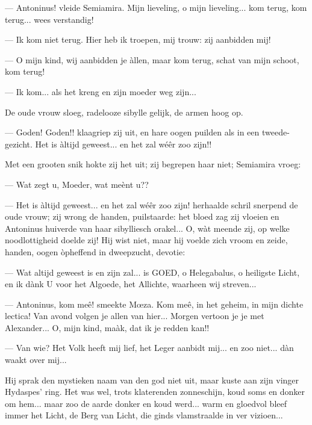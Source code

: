 \documentclass[a4paper, 12pt, oneside, dutch]{article}
\begin{document}
--- Antoninus! vleide Semiamira. Mijn lieveling, o mijn lieveling... kom terug, kom terug... wees verstandig!

--- Ik kom niet terug. Hier heb ik troepen, mij trouw: zij aanbidden mij!

--- O mijn kind, wij aanbidden je àllen, maar kom terug, schat van mijn schoot, kom terug!

--- Ik kom... als het kreng en zijn moeder weg zijn...

De oude vrouw sloeg, radelooze sibylle gelijk, de armen hoog op.

--- Goden! Goden!! klaagriep zij uit, en hare oogen puilden als in een tweede-gezicht. Het is àltijd geweest... en het zal wéêr zoo zijn!!

Met een grooten snik hokte zij het uit; zij begrepen haar niet; Semiamira vroeg:

--- Wat zegt u, Moeder, wat meènt u??

--- Het is àltijd geweest... en het zal wéêr zoo zijn! herhaalde schril snerpend de oude vrouw; zij wrong de handen, puilstaarde: het bloed zag zij vloeien en Antoninus huiverde van haar sibylliesch orakel... O, wàt meende zij, op welke noodlottigheid doelde zij! Hij wist niet, maar hij voelde zich vroom en zeide, handen, oogen òpheffend in dweepzucht, devotie:

--- Wat altijd geweest is en zijn zal... is GOED, o Helegabalus, o heiligste Licht, en ik dànk U voor het Algoede, het Allichte, waarheen wij streven...

--- Antoninus, kom meê! smeekte Mœza. Kom meê, in het geheim, in mijn dichte lectica! Van avond volgen je allen van hier... Morgen vertoon je je met Alexander... O, mijn kind, maàk, dat ik je redden kan!!

--- Van wie? Het Volk heeft mij lief, het Leger aanbidt mij... en zoo niet... dàn waakt over mij...

Hij sprak den mystieken naam van den god niet uit, maar kuste aan zijn vinger Hydaspes' ring. Het was wel, trots klaterenden zonneschijn, koud soms en donker om hem... maar zoo de aarde donker en koud werd... warm en gloedvol bleef immer het Licht, de Berg van Licht, die ginds vlamstraalde in ver vizioen...

\subsection{}
\end{document}
